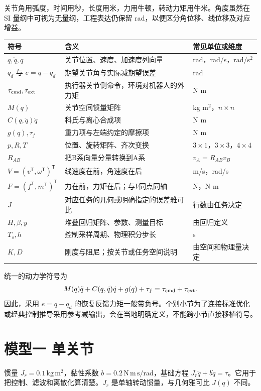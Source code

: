 关节角用弧度，时间用秒，长度用米，力用牛顿，转动力矩用牛米。角度虽然在 SI 量纲中可视为无量纲，工程表达仍保留 rad，以便区分角位移、线位移及对应增益。

\begin{longtable}{p{33mm}p{79mm}p{42mm}}
\toprule 符号 & 含义 & 常见单位或维度\\\midrule\endhead
$q,\dot q,\ddot q$ & 关节位置、速度、加速度列向量 & rad，rad/s，rad/s$^2$\\
$q_d$ 与 $e=q-q_d$ & 期望关节角与实际减期望误差 & rad\\
$\tau_{\rm cmd},\tau_{\rm ext}$ & 执行器关节侧命令，环境对机器人的外力矩 & N m\\
$M(q)$ & 关节空间惯量矩阵 & kg m$^2$，$n\times n$\\
$C(q,\dot q)\dot q$ & 科氏与离心合成项 & N m\\
$g(q),\tau_f$ & 重力项与左端约定的摩擦项 & N m\\
$p,R,T$ & 位置、旋转矩阵、齐次变换 & $3\times1$，$3\times3$，$4\times4$\\
$R_{AB}$ & 把B系向量分量转换到A系 & $v_A=R_{AB}v_B$\\
$V=(v^\mathsf T,\omega^\mathsf T)^\mathsf T$ & 线速度在前，角速度在后 & m/s，rad/s\\
$F=(f^\mathsf T,m^\mathsf T)^\mathsf T$ & 力在前，力矩在后；与$V$同点同轴 & N，N m\\
$J$ & 对应任务的几何或明确指定的误差雅可比 & 行数由任务决定\\
$H,\beta,y$ & 堆叠回归矩阵、参数、测量目标 & 由回归定义\\
$T_s,h$ & 控制采样周期、物理积分步长 & s\\
$K,D$ & 刚度与阻尼；按关节或任务空间说明 & 由空间和物理量决定\\
\bottomrule
\end{longtable}

统一的动力学符号为
\begin{equation*}
M(q)\ddot q+C(q,\dot q)\dot q+g(q)+\tau_f
=\tau_{\rm cmd}+\tau_{\rm ext}.
\end{equation*}
因此，采用 $e=q-q_d$ 的恢复反馈力矩一般带负号。个别小节为了连接标准优化或经典控制推导采用参考减输出，会在当地明确定义，不能跨小节直接移植符号。

\section*{模型一 单关节}

惯量 $J_r=0.1\,\mathrm{kg\,m^2}$，黏性系数 $b=0.2\,\mathrm{N\,m\,s/rad}$，基础方程 $J_r\ddot q+b\dot q=\tau$。它用于把控制、滤波和离散化算清楚。$J_r$ 是单轴转动惯量，与几何雅可比 $J(q)$ 不同。

